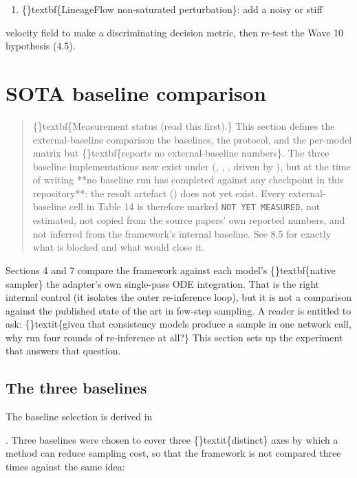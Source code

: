 \documentclass{article}
\begin{document}
\begin{enumerate}
\item \{\}textbf\{LineageFlow non-saturated perturbation\}: add a noisy or stiff
\end{enumerate}
velocity field to make  a discriminating decision metric, then re-test the Wave 10 hypothesis (4.5).

\section{SOTA baseline comparison}
\begin{quote}
\{\}textbf\{Measurement status (read this first).\} This section defines the
external-baseline comparison  the baselines, the protocol, and the
per-model matrix  but \{\}textbf\{reports no external-baseline numbers\}. The
three baseline implementations now exist under 
(, ,
, driven by ), but at the time
of writing **no baseline run has completed against any checkpoint in
this repository**: the result artefact
() does not yet
exist. Every external-baseline cell in Table 14 is therefore marked
\texttt{NOT YET MEASURED}, not estimated, not copied from the source papers'
own reported numbers, and not inferred from the framework's internal
baseline. See 8.5 for exactly what is blocked and what would close
it.
\end{quote}
Sections 4 and 7 compare the framework against each model's \{\}textbf\{native sampler\}  the adapter's own single-pass ODE integration. That is the right internal control (it isolates the outer re-inference loop), but it is not a comparison against the published state of the art in few-step sampling. A reader is entitled to ask: \{\}textit\{given that consistency models produce a sample in one network call, why run four rounds of re-inference at all?\} This section sets up the experiment that answers that question.

\subsection{The three baselines}
The baseline selection is derived in

. Three baselines were chosen to cover three \{\}textit\{distinct\} axes by which a method can reduce sampling cost, so that the framework is not compared three times against the same idea:
\end{document}
